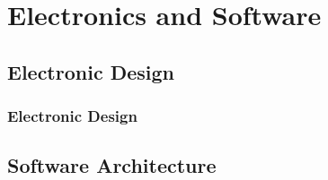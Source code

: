 \documentclass[169]{beamer}
\begin{document}
\section{Electronics and Software}
\subsection{Electronic Design}
\begin{frame}
    \frametitle{Electronic Design}
    \begin{figure}[htbp]
    \centering
        
    \end{figure}
\end{frame}

\subsection{Software Architecture}
\end{document}
